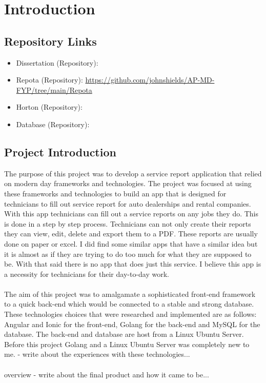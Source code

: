 \chapter{Introduction}
\section{Repository Links}
\begin{itemize}
    \item Dissertation (Repository):  
    \item Repota (Repository): \url{https://github.com/johnshields/AP-MD-FYP/tree/main/Repota}
    \item Horton (Repository):  
    \item Database (Repository):  
\end{itemize}

\section{Project Introduction}
The purpose of this project was to develop a service report application that relied on modern day frameworks and technologies. The project was focused at using these frameworks and technologies to build an app that is designed for technicians to fill out service report for auto dealerships and rental companies. With this app technicians can fill out a service reports on any jobs they do. This is done in a step by step process. Technicians can not only create their reports they can view, edit, delete and export them to a PDF. These reports are usually done on paper or excel. I did find some similar apps that have a similar idea but it is almost as if they are trying to do too much for what they are supposed to be. With that said there is no app that does just this service. I believe this app is a necessity for technicians for their day-to-day work.
\\\\ The aim of this project was to amalgamate a  sophisticated front-end framework to a quick back-end which would be connected to a stable and strong database. These technologies choices that were researched and implemented are as follows: Angular and Ionic for the front-end, Golang for the back-end and MySQL for the database. The back-end and database are host from a Linux Ubuntu Server. Before this project Golang and a Linux Ubuntu Server was completely new to me. 
- write about the experiences with these technologies...
\\\\ overview
- write about the final product and how it came to be... 

